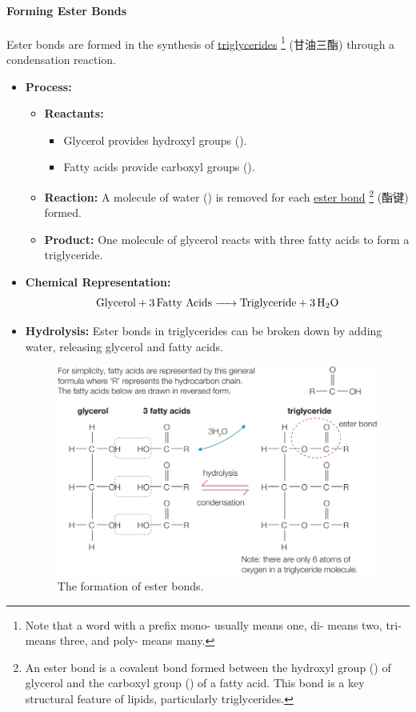 \paragraph{Forming Ester Bonds} Ester bonds are formed in the synthesis of \underline{triglycerides} \footnote{Note that a
word with a prefix mono- usually means one, di- means two, tri- means three, and poly- means many.} (甘油三酯) through a
condensation reaction.
\begin{itemize}
    \item \textbf{Process:}
    \begin{itemize}
        \item[1.] \textbf{Reactants:}
        \begin{itemize}
            \item Glycerol provides hydroxyl groups ().
            \item Fatty acids provide carboxyl groups ().
        \end{itemize}
        \item[2.] \textbf{Reaction:} A molecule of water () is removed for each \underline{ester bond} \footnote{An ester
        bond is a covalent bond formed between the hydroxyl group () of glycerol and the carboxyl group () of a fatty
        acid. This bond is a key structural feature of lipids, particularly triglycerides.} (酯键) formed.
        \item[3.] \textbf{Product:} One molecule of glycerol reacts with three fatty acids to form a triglyceride.
    \end{itemize}
    \item \textbf{Chemical Representation:}
    \begin{equation}
        \ce{\text{Glycerol} + 3\text{Fatty Acids} -> \text{Triglyceride} + 3H2O}
    \end{equation}
    \item \textbf{Hydrolysis:} Ester bonds in triglycerides can be broken down by adding water, releasing glycerol and fatty
    acids.
    \begin{figure}[H]
        \centering
        \includegraphics[scale=0.35]{Biology/1A/Images/1A-4-4.png}
        \caption{The formation of ester bonds.}
    \end{figure}
\end{itemize}
